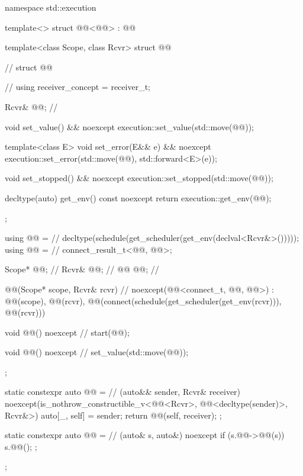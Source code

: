 %
\begin{codeblock}
namespace std::execution {
  template<>
  struct @@<@@> : @@ {
    template<class Scope, class Rcvr>
    struct @@ {                          // \expos
      struct @@ {                       // \expos
        using receiver_concept = receiver_t;

        Rcvr& @@;                         // \expos

        void set_value() && noexcept {
          execution::set_value(std::move(@@));
        }

        template<class E>
          void set_error(E&& e) && noexcept {
            execution::set_error(std::move(@@), std::forward<E>(e));
          }

        void set_stopped() && noexcept {
          execution::set_stopped(std::move(@@));
        }

        decltype(auto) get_env() const noexcept {
          return execution::get_env(@@);
        }
      };

      using @@ =                  // \expos
        decltype(schedule(get_scheduler(get_env(declval<Rcvr&>()))));
      using @@ =                          // \expos
        connect_result_t<@@, @@>;

      Scope* @@;                         // \expos
      Rcvr& @@;                       // \expos
      @@ @@;                              // \expos

      @@(Scope* scope, Rcvr& rcvr)       // \expos
        noexcept(@@<connect_t, @@, @@>)
        : @@(scope),
          @@(rcvr),
          @@(connect(schedule(get_scheduler(get_env(rcvr))), @@(rcvr))) {}

      void @@() noexcept {            // \expos
        start(@@);
      }

      void @@() noexcept {     // \expos
        set_value(std::move(@@));
      }
    };

    static constexpr auto @@ =       // (auto&& sender, Rcvr& receiver)
        noexcept(is_nothrow_constructible_v<@@<Rcvr>, @@<decltype(sender)>, Rcvr&>) {
        auto[_, self] = sender;
        return @@(self, receiver);
      };

    static constexpr auto @@ =           // \expos
      [](auto& s, auto&) noexcept {
        if (s.@@->@@(s))
          s.@@();
      };
  };
}
\end{codeblock}

